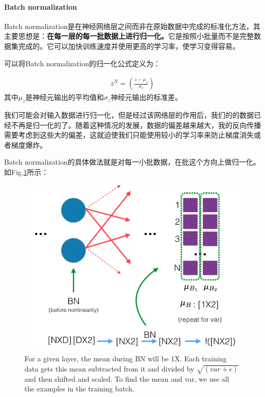 \documentclass[letterpaper,10pt]{article}
\begin{document}
	
	\paragraph{Batch normalization}
	
	Batch normalization是在神经网络层之间而非在原始数据中完成的标准化方法，其主要思想是：\textbf{在每一层的每一批数据上进行归一化。}它是按照小批量而不是完整数据集完成的。它可以加快训练速度并使用更高的学习率，使学习变得容易。
	
	可以将Batch normalization的归一化公式定义为： 
	
	\begin{equation}
		\begin{aligned}
			z^{N} = \left( \frac{z-\mu_{z}}{\sigma_{z}} \right)
		\end{aligned}
		\label{eq: Batch normalization}
	\end{equation}
	其中$\mu_z$是神经元输出的平均值和$\sigma_z$神经元输出的标准差。
	
	我们可能会对输入数据进行归一化，但是经过该网络层的作用后，我们的的数据已经不再是归一化的了。随着这种情况的发展，数据的偏差越来越大，我的反向传播需要考虑到这些大的偏差，这就迫使我们只能使用较小的学习率来防止梯度消失或者梯度爆炸。
	
	
	Batch normalization的具体做法就是对每一小批数据，在批这个方向上做归一化。如Fig.\ref{fig: Batch_normlization}所示：
	
	\begin{figure}[htbp]
		\centering 
		\includegraphics[width=0.6\columnwidth]{picture/batch_normalization}
		\captionsetup{font=scriptsize}
		\caption{
			\label{fig: Batch_normlization} For a given layer, the mean during BN will be 1X. Each training data gets this mean subtracted from it and divided by $\sqrt{(var + \epsilon)}$ and then shifted and scaled. To find the mean and var, we use all the examples in the training batch.
		}
	\end{figure}
	
\end{document}
